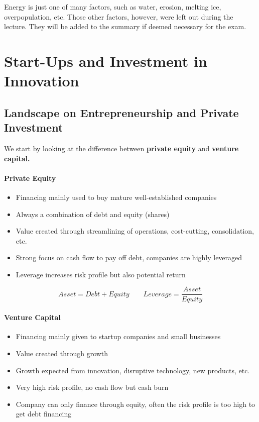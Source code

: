 \documentclass[a4paper]{extarticle}
\begin{document}
Energy is just one of many factors, such as water, erosion, melting ice, overpopulation, etc. Those other factors, however, were left out during the lecture. They will be added to the summary if deemed necessary for the exam.

\section{Start-Ups and Investment in Innovation}

\subsection{Landscape on Entrepreneurship and Private Investment}

We start by looking at the difference between \textbf{private equity} and \textbf{venture capital.}

\paragraph{Private Equity}

\begin{itemize}
    \item Financing mainly used to buy mature well-established companies
    \item Always a combination of debt and equity (shares)
    \item Value created through streamlining of operations, cost-cutting, consolidation, etc.
    \item Strong focus on cash flow to pay off debt, companies are highly leveraged
    \item Leverage increases risk profile but also potential return
\end{itemize}

\[
    Asset = Debt + Equity \qquad Leverage = \frac{Asset}{Equity}
\]

\paragraph{Venture Capital}

\begin{itemize}
    \item Financing mainly given to startup companies and small businesses
    \item Value created through growth
    \item Growth expected from innovation, disruptive technology, new products, etc.
    \item Very high risk profile, no cash flow but cash burn
    \item Company can only finance through equity, often the risk profile is too high to get debt financing
\end{itemize}
\end{document}
